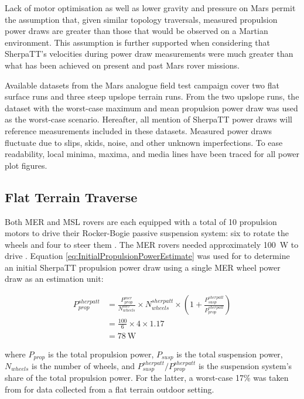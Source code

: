 \clearpage
Lack of motor optimisation as well as lower gravity and pressure on Mars permit the assumption that, given similar topology traversals, measured propulsion power draws are greater than those that would be observed on a Martian environment. This assumption is further supported when considering that SherpaTT's velocities during power draw measurements were much greater than what has been achieved on present and past Mars rover missions.

Available datasets from the Mars analogue field test campaign cover two flat surface runs and three steep upslope terrain runs. From the two upslope runs, the dataset with the worst-case maximum and mean propulsion power draw was used as the worst-case scenario. Hereafter, all mention of SherpaTT power draws will reference measurements included in these datasets. Measured power draws fluctuate due to slips, skids, noise, and other unknown imperfections. To ease readability, local minima, maxima, and media lines have been traced for all power plot figures.

\subsection{Flat Terrain Traverse}
\label{sec:PowerBudget:PropulsionPowerBudget:FlatTerrainTraverse}
Both \ac{MER} and \ac{MSL} rovers are each equipped with a total of 10 propulsion motors to drive their Rocker-Bogie passive suspension system: six to rotate the wheels and four to steer them  . The \ac{MER} rovers needed approximately \SI{100}{\watt} to drive . Equation \ref{eq:InitialPropulsionPowerEstimate} was used for to determine an initial SherpaTT propulsion power draw using a single \ac{MER} wheel power draw as an estimation unit:

\begin{align}
  \label{eq:InitialPropulsionPowerEstimate}
  P_{prop}^{sherpatt} &= \frac{P_{prop}^{mer}}{N_{wheels}^{mer}} \times N_{wheels}^{sherpatt} \times \left(1 +\frac{P_{susp}^{sherpatt}}{P_{prop}^{sherpatt}}\right) \\
           &= \frac{100}{6} \times 4 \times 1.17\\
           &= \SI{78}{\watt}
\end{align}


where $P_{prop}$ is the total propulsion power, $P_{susp}$ is the total suspension power, $N_{wheels}$ is the number of wheels, and $P_{susp}^{sherpatt} / P_{prop}^{sherpatt}$ is the suspension system's share of the total propulsion power. For the latter, a worst-case 17\% was taken from  for data collected from a flat terrain outdoor setting.

